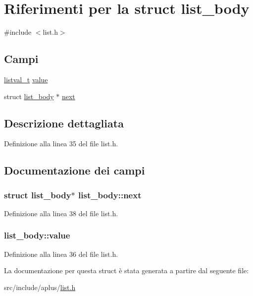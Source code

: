 \hypertarget{structlist__body}{\section{Riferimenti per la struct list\+\_\+body}
\label{structlist__body}
}


{\ttfamily \#include $<$list.\+h$>$}

\subsection*{Campi}
\begin{DoxyCompactItemize}
\item 
\hyperlink{list_8h_a83bc1af7566502e08756b8d8c425972e}{listval\+\_\+t} \hyperlink{structlist__body_ae3194d24911b82410a61d50f5e6f588d}{value}
\item 
struct \hyperlink{structlist__body}{list\+\_\+body} $\ast$ \hyperlink{structlist__body_ae0f31e0790456c070895880578d171ca}{next}
\end{DoxyCompactItemize}


\subsection{Descrizione dettagliata}


Definizione alla linea 35 del file list.\+h.



\subsection{Documentazione dei campi}
\hypertarget{structlist__body_ae0f31e0790456c070895880578d171ca}{
\subsubsection[{next}]{\setlength{\rightskip}{0pt plus 5cm}struct {\bf list\+\_\+body}$\ast$ list\+\_\+body\+::next}}\label{structlist__body_ae0f31e0790456c070895880578d171ca}


Definizione alla linea 38 del file list.\+h.

\hypertarget{structlist__body_ae3194d24911b82410a61d50f5e6f588d}{
\subsubsection[{value}]{ list\+\_\+body\+::value}}\label{structlist__body_ae3194d24911b82410a61d50f5e6f588d}


Definizione alla linea 36 del file list.\+h.



La documentazione per questa struct è stata generata a partire dal seguente file\+:\begin{DoxyCompactItemize}
\item 
src/include/aplus/\hyperlink{list_8h}{list.\+h}\end{DoxyCompactItemize}
